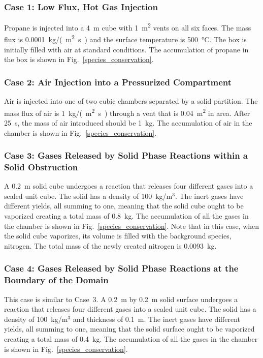 \documentclass[11pt]{book}
\begin{document}
\subsubsection{Case 1: Low Flux, Hot Gas Injection}

Propane is injected into a 4~m cube with 1~\unit{m^2} vents on all six faces.  The mass flux is 0.0001~\unit{kg/(m^2.s)} and the surface temperature is 500~\unit{\degreeCelsius}.  The box is initially filled with air at standard conditions. The accumulation of propane in the box is shown in Fig.~\ref{species_conservation}.

\subsubsection{Case 2: Air Injection into a Pressurized Compartment}

Air is injected into one of two cubic chambers separated by a solid partition.  The mass flux of air is 1~\unit{kg/(m^2.s)} through a vent that is 0.04~\unit{m^2} in area. After 25~s, the mass of air introduced should be 1~kg. The accumulation of air in the chamber is shown in Fig.~\ref{species_conservation}.

\subsubsection{Case 3: Gases Released by Solid Phase Reactions within a Solid Obstruction}

A 0.2~m solid cube undergoes a reaction that releases four different gases into a sealed unit cube. The solid has a density of 100~kg/m$^3$. The inert gases have different yields, all summing to one, meaning that the solid cube ought to be vaporized creating a total mass of 0.8~kg. The accumulation of all the gases in the chamber is shown in Fig.~\ref{species_conservation}. Note that in this case, when the solid cube vaporizes, its volume is filled with the background species, nitrogen. The total mass of the newly created nitrogen is 0.0093~kg.

\subsubsection{Case 4: Gases Released by Solid Phase Reactions at the Boundary of the Domain}

This case is similar to Case~3. A 0.2~m by 0.2~m solid surface undergoes a reaction that releases four different gases into a sealed unit cube. The solid has a density of 100~kg/m$^3$ and thickness of 0.1~m. The inert gases have different yields, all summing to one, meaning that the solid surface ought to be vaporized creating a total mass of 0.4~kg. The accumulation of all the gases in the chamber is shown in Fig.~\ref{species_conservation}.
\end{document}
